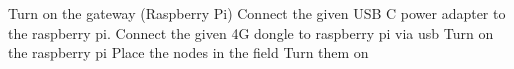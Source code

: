 \markdownRendererUlEnd \markdownRendererInterblockSeparator
{}\markdownRendererOlBeginTight
{}Turn on the gateway (Raspberry Pi)\markdownRendererInterblockSeparator
{}\markdownRendererUlBeginTight
\markdownRendererUlItem Connect the given USB C power adapter to the raspberry pi.\markdownRendererUlItemEnd 
\markdownRendererUlItem Connect the given 4G dongle to raspberry pi via usb\markdownRendererUlItemEnd 
\markdownRendererUlItem Turn on the raspberry pi\markdownRendererUlItemEnd 
\markdownRendererUlEndTight \markdownRendererOlItemEnd 
{}Place the nodes in the field\markdownRendererOlItemEnd 
{}Turn them on\markdownRendererOlItemEnd 
\markdownRendererOlEndTight \relax